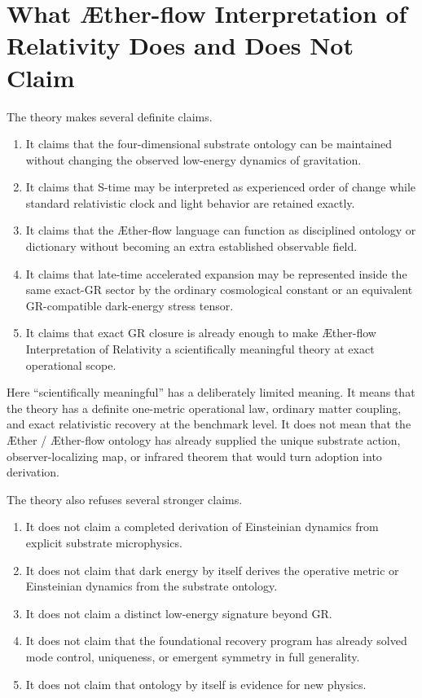 \documentclass[11pt]{article}
\newcommand{\Aether}{\AE{}ther}
\newcommand{\Aflow}{\AE{}ther-flow}
\newcommand{\TheoryName}{\Aflow{} Interpretation of Relativity}
\begin{document}
\section{What \TheoryName{} Does and Does Not Claim}

The theory makes several definite claims.
\begin{enumerate}
    \item It claims that the four-dimensional substrate ontology can be maintained without changing the observed low-energy dynamics of gravitation.
    \item It claims that S-time may be interpreted as experienced order of change while standard relativistic clock and light behavior are retained exactly.
    \item It claims that the \Aflow{} language can function as disciplined ontology or dictionary without becoming an extra established observable field.
    \item It claims that late-time accelerated expansion may be represented inside the same exact-GR sector by the ordinary cosmological constant or an equivalent GR-compatible dark-energy stress tensor.
    \item It claims that exact GR closure is already enough to make \TheoryName{} a scientifically meaningful theory at exact operational scope.
\end{enumerate}

Here ``scientifically meaningful'' has a deliberately limited meaning. It means that the theory has a definite one-metric operational law, ordinary matter coupling, and exact relativistic recovery at the benchmark level. It does not mean that the \Aether{} / \Aflow{} ontology has already supplied the unique substrate action, observer-localizing map, or infrared theorem that would turn adoption into derivation.

The theory also refuses several stronger claims.
\begin{enumerate}
    \item It does not claim a completed derivation of Einsteinian dynamics from explicit substrate microphysics.
    \item It does not claim that dark energy by itself derives the operative metric or Einsteinian dynamics from the substrate ontology.
    \item It does not claim a distinct low-energy signature beyond GR.
    \item It does not claim that the foundational recovery program has already solved mode control, uniqueness, or emergent symmetry in full generality.
    \item It does not claim that ontology by itself is evidence for new physics.
\end{enumerate}
\end{document}
